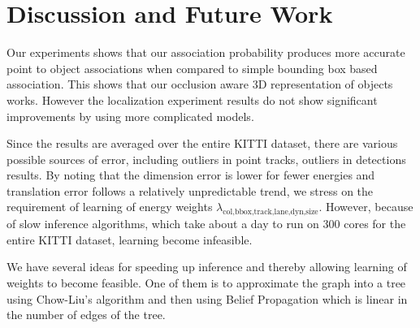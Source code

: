 \section{Discussion and Future Work}
\label{sec:discussions}

Our experiments shows that our association probability produces more accurate point to object associations when compared to simple bounding box based association. This shows that our occlusion aware 3D representation of objects works. However the localization experiment results do not show significant improvements by using more complicated models. 

Since the results are averaged over the entire KITTI dataset, there are various possible sources of error, including outliers in point tracks, outliers in detections results. By noting that the dimension error is lower for fewer energies and translation error follows a relatively unpredictable trend, we stress on the requirement of learning of energy weights $\lambda_{\text{col,bbox,track,lane,dyn,size}}$. However, because of slow inference algorithms, which take about a day to run on 300 cores for the entire KITTI dataset, learning become infeasible.

We have several ideas for speeding up inference and thereby allowing learning
of weights to become feasible. One of them is to approximate the graph into a tree using Chow-Liu's \cite{chow1968approximating} algorithm and then using Belief Propagation which is linear in the number of edges of the tree.
